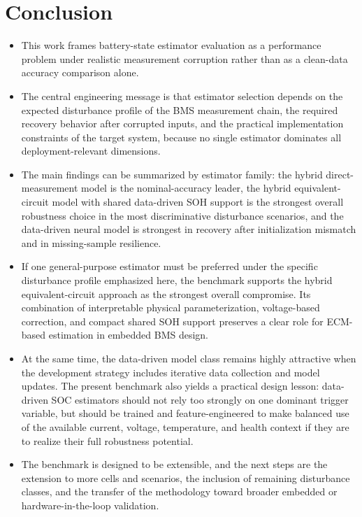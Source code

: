 \documentclass[review]{elsarticle}
\begin{document}
\section{Conclusion}
\begin{itemize}[leftmargin=*]
    \item This work frames battery-state estimator evaluation as a performance problem under realistic measurement corruption rather than as a clean-data accuracy comparison alone.
    \item The central engineering message is that estimator selection depends on the expected disturbance profile of the BMS measurement chain, the required recovery behavior after corrupted inputs, and the practical implementation constraints of the target system, because no single estimator dominates all deployment-relevant dimensions.
    \item The main findings can be summarized by estimator family: the hybrid direct-measurement model is the nominal-accuracy leader, the hybrid equivalent-circuit model with shared data-driven SOH support is the strongest overall robustness choice in the most discriminative disturbance scenarios, and the data-driven neural model is strongest in recovery after initialization mismatch and in missing-sample resilience.
    \item If one general-purpose estimator must be preferred under the specific disturbance profile emphasized here, the benchmark supports the hybrid equivalent-circuit approach as the strongest overall compromise. Its combination of interpretable physical parameterization, voltage-based correction, and compact shared SOH support preserves a clear role for ECM-based estimation in embedded BMS design.
    \item At the same time, the data-driven model class remains highly attractive when the development strategy includes iterative data collection and model updates. The present benchmark also yields a practical design lesson: data-driven SOC estimators should not rely too strongly on one dominant trigger variable, but should be trained and feature-engineered to make balanced use of the available current, voltage, temperature, and health context if they are to realize their full robustness potential.
    \item The benchmark is designed to be extensible, and the next steps are the extension to more cells and scenarios, the inclusion of remaining disturbance classes, and the transfer of the methodology toward broader embedded or hardware-in-the-loop validation.
\end{itemize}
\end{document}
